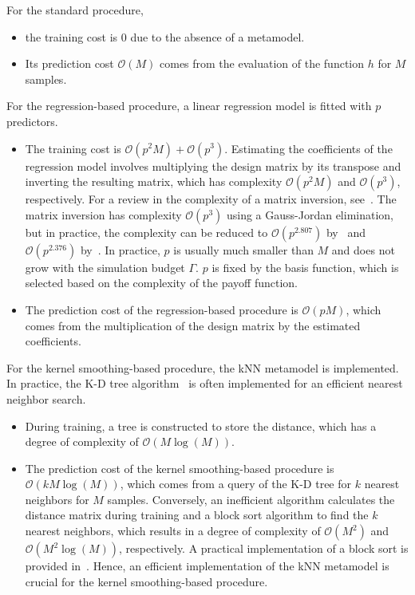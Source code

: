 For the standard procedure, 
\begin{itemize}
    \item the training cost is $0$ due to the absence of a metamodel. 
    \item Its prediction cost $\mathcal{O}(M)$ comes from the evaluation of the function $h$ for $M$ samples.
\end{itemize}
For the regression-based procedure, a linear regression model is fitted with $p$ predictors.
\begin{itemize}
    \item The training cost is $\mathcal{O}(p^2M) + \mathcal{O}(p^3)$.
          Estimating the coefficients of the regression model involves multiplying the design matrix by its transpose and inverting the resulting matrix, which has complexity $\mathcal{O}(p^2M)$ and $\mathcal{O}(p^3)$, respectively.
          For a review in the complexity of a matrix inversion, see~\cite{stothers2010complexity}.
          The matrix inversion has complexity $\mathcal{O}(p^3)$ using a Gauss-Jordan elimination, but in practice, the complexity can be reduced to $\mathcal{O}(p^{2.807})$ by~\cite{strassen1969gaussian} and $\mathcal{O}(p^{2.376})$ by~\cite{coppersmith1987matrix}.
          In practice, $p$ is usually much smaller than $M$ and does not grow with the simulation budget $\Gamma$.
          $p$ is fixed by the basis function, which is selected based on the complexity of the payoff function.
    \item The prediction cost of the regression-based procedure is $\mathcal{O}(pM)$, which comes from the multiplication of the design matrix by the estimated coefficients.
\end{itemize}
For the kernel smoothing-based procedure, the kNN metamodel is implemented. 
In practice, the K-D tree algorithm~\citep{bentley1975multidimensional} is often implemented for an efficient nearest neighbor search.
\begin{itemize}
    \item During training, a tree is constructed to store the distance, which has a degree of complexity of $\mathcal{O}(M\log(M))$.
    \item The prediction cost of the kernel smoothing-based procedure is $\mathcal{O}(kM\log(M))$, which comes from a query of the K-D tree for $k$ nearest neighbors for $M$ samples.
    Conversely, an inefficient algorithm calculates the distance matrix during training and a block sort algorithm to find the $k$ nearest neighbors, which results in a degree of complexity of $\mathcal{O}(M^2)$ and $\mathcal{O}(M^2\log(M))$, respectively.
    A practical implementation of a block sort is provided in~\cite{kim2008ratio}.
    Hence, an efficient implementation of the kNN metamodel is crucial for the kernel smoothing-based procedure.
\end{itemize}
